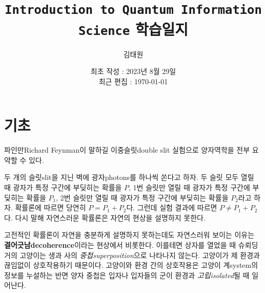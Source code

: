 \documentclass[a4paper,chapter,atbegshi]{oblivoir}
\title{\texttt{Introduction to Quantum Information Science} 학습일지}
\author{김태원}
\date{최초 작성 : 2023년 8월 29일 \\ 최근 편집 : \today}
\begin{document}
\maketitle
\break
\tableofcontents
\chapter{기초}
파인만{\tiny Richard Feynman}이 말하길 이중슬릿{\tiny double slit} 실험으로
양자역학을 전부 요약할 수 있다.

두 개의 슬릿{\tiny slit}을 지닌 벽에 광자{\tiny photons}를 하나씩 쏜다고 하자.
두 슬릿 모두 열릴 때 광자가 특정 구간에 부딪히는 확률을 $P$, 1번 슬릿만
열릴 때 광자가 특정 구간에 부딪히는 확률을 $P_1$, 2번 슬릿만 열릴 때 광자가
특정 구간에 부딪히는 확률을 $P_2$라고 하자. 확률론에 따르면 당연히 $P=P_1+P_2$다.
그런데 실험 결과에 따르면 $P\neq P_1+P_2$다. 다시 말해 자연스러운 확률론은 자연의 
현상을 설명하지 못한다.

고전적인 확률론이 자연을 충분하게 설명하지 못하는데도 자연스러워 보이는 이유는 
\textbf{결어긋남\tiny decoherence}이라는 현상에서 비롯한다. 이를테면 상자를
열었을 때 슈뢰딩거의 고양이는 생과 사의 \emph{중첩\tiny superposition}으로
나타나지 않는다. 고양이가 제 환경과 끊임없이 상호작용하기 때문이다. 고양이와
환경 간의 상호작용은 고양이 계{\tiny system}의 정보를 누설하는 반면 양자
중첩은 입자나 입자들의 군이 환경과 \emph{고립\tiny isolated}될 때 일어난다.
\end{document}

